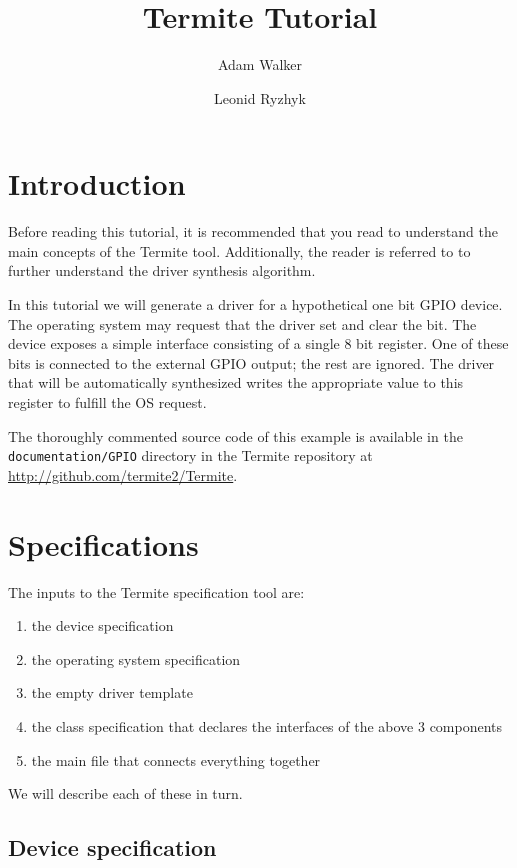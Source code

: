 \documentclass{article}
\newcommand{\code}[1]{\texttt{#1}}
\begin{document}
\title{Termite Tutorial}
\author{Adam Walker \and Leonid Ryzhyk}

\maketitle

\tableofcontents

\section{Introduction}

Before reading this tutorial, it is recommended that you read \cite{Ryzhyk_WKLRSV_14} to understand the main concepts of the Termite tool. Additionally, the reader is referred to \cite{Walker_Ryzhyk_14} to further understand the driver synthesis algorithm.

In this tutorial we will generate a driver for a hypothetical one bit GPIO device. The operating system may request that the driver set and clear the bit. The device exposes a simple interface consisting of a single 8 bit register. One of these bits is connected to the external GPIO output; the rest are ignored. The driver that will be automatically synthesized writes the appropriate value to this register to fulfill the OS request. 

The thoroughly commented source code of this example is available in the \code{documentation/GPIO} directory in the Termite repository at \url{http://github.com/termite2/Termite}.

\section{Specifications}

The inputs to the Termite specification tool are:
\begin{enumerate}
    \item the device specification
    \item the operating system specification
    \item the empty driver template
    \item the class specification that declares the interfaces of the above 3 components
    \item the main file that connects everything together
\end{enumerate}

We will describe each of these in turn.

\subsection{Device specification}
\end{document}
